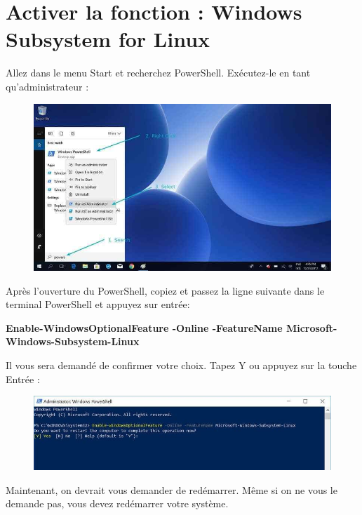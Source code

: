 \documentclass{article}
\begin{document}
\section{Activer la fonction : Windows Subsystem for Linux}
Allez dans le menu Start et recherchez PowerShell. Exécutez-le en tant qu'administrateur :
\begin{figure}[H]
\includegraphics[width=1\textwidth]{Plots/Powershell-Ubuntu-install.jpg}
\end{figure}
Après l'ouverture du PowerShell, copiez et passez la ligne suivante dans le terminal PowerShell et appuyez sur entrée:

\begin{tcolorbox}[width=\textwidth,colback={purple},title={PowerShell terminal},outer arc=0mm,colupper=white]    
    \large\textbf{ Enable-WindowsOptionalFeature -Online -FeatureName Microsoft-Windows-Subsystem-Linux }
\end{tcolorbox}
Il vous sera demandé de confirmer votre choix. Tapez Y ou appuyez sur la touche Entrée :
\begin{figure}[H]
\includegraphics[width=1\textwidth]{Plots/Powershell-Ubuntu-install-2.jpg}
\end{figure}

Maintenant, on devrait vous demander de redémarrer. Même si on ne vous le demande pas, vous devez redémarrer votre système.
\end{document}
